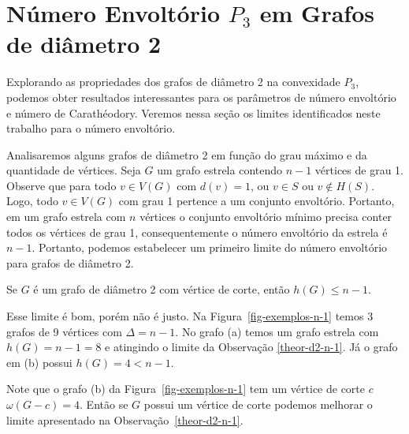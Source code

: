 \chapter{Número Envoltório $P_3$ em Grafos de diâmetro 2}
\label{envoltoria}

Explorando as propriedades dos grafos de diâmetro 2 na convexidade $P_3$, podemos obter resultados interessantes para os parâmetros de número envoltório e número de Carathéodory. Veremos nessa seção os limites identificados neste trabalho para o número envoltório.

Analisaremos alguns grafos de diâmetro 2 em função do grau máximo e da quantidade de vértices. Seja $G$ um grafo estrela contendo $n-1$ vértices de grau 1.  Observe que para todo $v\in V(G)$ com $d(v)=1$, ou $v \in S$ ou $v \notin H(S)$. Logo, todo $v \in V(G)$ com grau 1 pertence a um conjunto envoltório. Portanto, em um grafo estrela com $n$ vértices o conjunto envoltório mínimo precisa conter todos os vértices de grau 1, consequentemente o número envoltório da estrela é $n-1$. Portanto, podemos estabelecer um primeiro limite do número envoltório para grafos de diâmetro 2.

\begin{observation}
Se $G$ é um grafo de diâmetro 2 com vértice de corte, então $h(G) \le n-1$.
\label{theor-d2-n-1}
\end{observation}

Esse limite é bom, porém não é justo. Na Figura~\ref{fig-exemplos-n-1} temos 3 grafos de 9 vértices com $\Delta=n-1$. No grafo (a) temos um grafo estrela com $h(G)=n-1=8$ e atingindo o limite da Observação \ref{theor-d2-n-1}. Já o grafo em (b) possui $h(G)=4<n-1$. 

Note que o grafo (b) da Figura~\ref{fig-exemplos-n-1} tem um vértice de corte $c$ $\omega(G-c)=4$. Então se $G$ possui um vértice de corte podemos melhorar o limite apresentado na Observação~\ref{theor-d2-n-1}.

